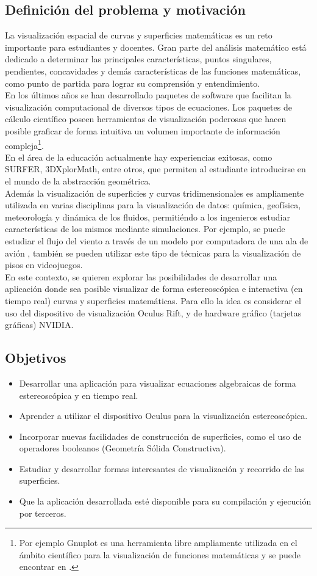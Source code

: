 \documentclass[12pt]{article}
\begin{document}
\subsection{Definición del problema y motivación}
La visualización espacial de curvas y superficies matemáticas es un reto importante para estudiantes y docentes. Gran parte del análisis matemático está dedicado a determinar las principales características, puntos singulares, pendientes, concavidades y demás características de las  funciones matemáticas, como punto de partida para lograr su comprensión y entendimiento.
\\En los últimos años se han desarrollado paquetes de software que facilitan la visualización computacional de diversos tipos de ecuaciones. Los paquetes de cálculo científico poseen herramientas de visualización poderosas que hacen posible graficar de forma intuitiva un volumen importante de información compleja\footnote{Por ejemplo Gnuplot es una herramienta libre ampliamente utilizada en el ámbito científico para la visualización de funciones matemáticas y se puede encontrar en \cite{gnuplot}.}.  
\\En el área de la educación actualmente hay experiencias exitosas, como SURFER\cite{surfer}, 3DXplorMath\cite{dxplormath}, entre otros, que permiten al estudiante introducirse en el mundo de la abstracción geométrica. 
\\Además la visualización de superficies y curvas tridimensionales es ampliamente utilizada en varias disciplinas para la visualización de datos: química, geofísica, meteorología y dinámica de los fluidos, permitiéndo a los ingenieros estudiar características de los mismos mediante simulaciones. Por ejemplo, se puede estudiar el flujo del viento a través de un modelo por computadora de una ala de avión \cite{aircraftwing}, también se pueden utilizar este tipo de técnicas para la visualización de pisos en videojuegos\cite{realtimerendering}\cite{engine}.
\\En este contexto, se quieren explorar las posibilidades de desarrollar una aplicación donde sea posible visualizar de forma estereoscópica e interactiva (en tiempo real) curvas y superficies matemáticas. Para ello la idea es considerar el uso del dispositivo de visualización Oculus Rift, y de hardware gráfico (tarjetas gráficas) NVIDIA.
\subsection{Objetivos}
\begin{itemize}
\item Desarrollar una aplicación para visualizar ecuaciones algebraicas de forma estereoscópica y en tiempo real.
\item Aprender a utilizar el dispositivo Oculus para la visualización estereoscópica. 
\item Incorporar nuevas facilidades de construcción de superficies, como el uso de operadores booleanos (Geometría Sólida Constructiva). 
\item Estudiar y desarrollar formas interesantes de visualización y recorrido de las superficies.
\item Que la aplicación desarrollada esté disponible para su compilación y ejecución por terceros. 
\end{itemize}
\end{document}
